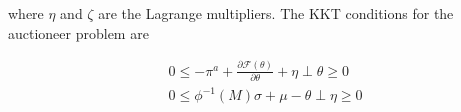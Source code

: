\documentclass[11pt, letterpaper]{article}
\begin{document}
\begin{appendices}
where $\eta$ and $\zeta$ are the Lagrange multipliers. The KKT conditions for the auctioneer problem are

\begin{align}
    & 0 \leq -\pi^{a}+ \frac{\partial \mathcal{F}(\theta)}{\partial \theta} +\eta \perp \theta \geq 0 \\
    & 0 \leq \phi^{-1}(M) \sigma+ \mu - \theta  \perp \eta \geq 0
\end{align}

\end{appendices}

\newpage


\end{document}
